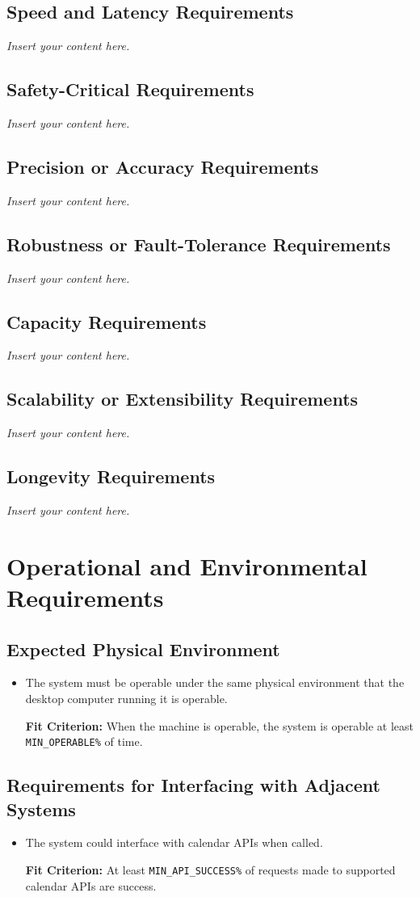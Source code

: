 \documentclass[12pt]{article}
\newcommand{\lips}{\textit{Insert your content here.}}
\newcounter{nfrnum} %
\newcommand{\rthenfrnum}{NFR\refstepcounter{nfrnum}\thenfrnum:}
\begin{document}
\subsection{Speed and Latency Requirements}
\lips
\subsection{Safety-Critical Requirements}
\lips
\subsection{Precision or Accuracy Requirements}
\lips
\subsection{Robustness or Fault-Tolerance Requirements}
\lips
\subsection{Capacity Requirements}
\lips
\subsection{Scalability or Extensibility Requirements}
\lips
\subsection{Longevity Requirements}
\lips

\section{Operational and Environmental Requirements}
\subsection{Expected Physical Environment}
\begin{itemize}
\item[\rthenfrnum]
The system must be operable under the same physical environment that the desktop computer running it is operable.

\textbf{Fit Criterion:} When the machine is operable, the system is operable at least \texttt{MIN\_OPERABLE\%} of time.
\end{itemize}
\subsection{Requirements for Interfacing with Adjacent Systems}
\begin{itemize}
\item[\rthenfrnum]
The system could interface with calendar APIs when called.

\textbf{Fit Criterion:} At least \texttt{MIN\_API\_SUCCESS\%} of requests made to supported calendar APIs are success.
\end{itemize}
\end{document}
